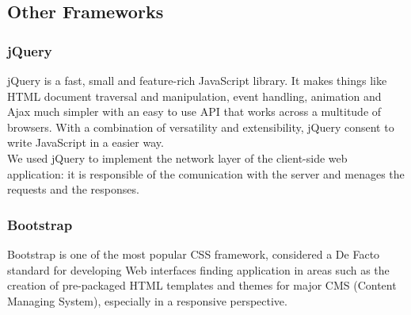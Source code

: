 \subsection{Other Frameworks}

\subsubsection{jQuery}
jQuery is a fast, small and feature-rich JavaScript library. It makes things like HTML document traversal and manipulation, event handling, animation and Ajax much simpler with an easy to use API that works across a multitude of browsers. With a combination of versatility and extensibility, jQuery consent to write JavaScript in a easier way.
\\ We used jQuery to implement the network layer of the client-side web application: it is responsible of the comunication with the server and menages the requests and the responses.

\subsubsection{Bootstrap}
Bootstrap is one of the most popular CSS framework, considered a De Facto standard for developing Web interfaces finding application in areas such as the creation of pre-packaged HTML templates and themes for major CMS (Content Managing System), especially in a responsive perspective.

